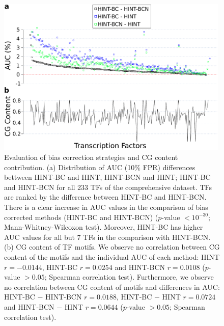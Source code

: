 \documentclass[11pt]{article}
\begin{document}
\begin{figure}[h!]
\centering
\includegraphics[width=0.99\textwidth]{Figs/Fig4.pdf}
\caption{Evaluation of bias correction strategies and CG content contribution. (a) Distribution of AUC (10$\%$ FPR) differences bettween HINT-BC and HINT, HINT-BCN and HINT; HINT-BC and HINT-BCN for all 233 TFs of the comprehensive dataset. TFs are ranked by the difference between HINT-BC and HINT-BCN. There is a clear increase in AUC values in the comparison of bias corrected methods (HINT-BC and HINT-BCN) ($p$-value $< 10^{-30}$; Mann-Whitney-Wilcoxon test). Moreover, HINT-BC has higher AUC values for all but 7 TFs in the comparison with HINT-BCN. (b) CG content of TF motifs. We observe no correlation between CG content of the motifs and the individual AUC of each method: HINT $ r = −0.0144$, HINT-BC $ r = 0.0254$ and HINT-BCN $ r = 0.0108$ ($p$-value $> 0.05$; Spearman correlation test). Furthermore, we observe no correlation between CG content of motifs and differences in AUC: HINT-BC $-$ HINT-BCN $ r = 0.0188$, HINT-BC $-$ HINT $ r = 0.0724$ and HINT-BCN $-$ HINT $ r = 0.0644$ ($p$-value $> 0.05$; Spearman correlation test).}
\label{fig:scatterplothint}
\end{figure}

\clearpage
\end{document}
